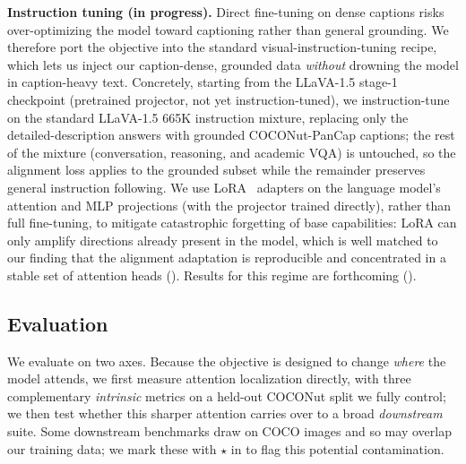 \textbf{Instruction tuning (in progress).} Direct fine-tuning on dense captions risks over-optimizing the model toward captioning rather than general grounding. We therefore port the objective into the standard visual-instruction-tuning recipe, which lets us inject our caption-dense, grounded data \emph{without} drowning the model in caption-heavy text. Concretely, starting from the LLaVA-1.5 stage-1 checkpoint (pretrained projector, not yet instruction-tuned), we instruction-tune on the standard LLaVA-1.5 665K instruction mixture, replacing only the detailed-description answers with grounded COCONut-PanCap captions; the rest of the mixture (conversation, reasoning, and academic VQA) is untouched, so the alignment loss applies to the grounded subset while the remainder preserves general instruction following. We use LoRA~\citep{hu2022lora} adapters on the language model's attention and MLP projections (with the projector trained directly), rather than full fine-tuning, to mitigate catastrophic forgetting of base capabilities: LoRA can only amplify directions already present in the model, which is well matched to our finding that the alignment adaptation is reproducible and concentrated in a stable set of attention heads (). Results for this regime are forthcoming ().

\subsection{Evaluation}
\label{sec:metrics}
We evaluate on two axes. Because the objective is designed to change \emph{where} the model attends, we first measure attention localization directly, with three complementary \emph{intrinsic} metrics on a held-out COCONut split we fully control; we then test whether this sharper attention carries over to a broad \emph{downstream} suite. Some downstream benchmarks draw on COCO images and so may overlap our training data; we mark these with $\star$ in  to flag this potential contamination.

